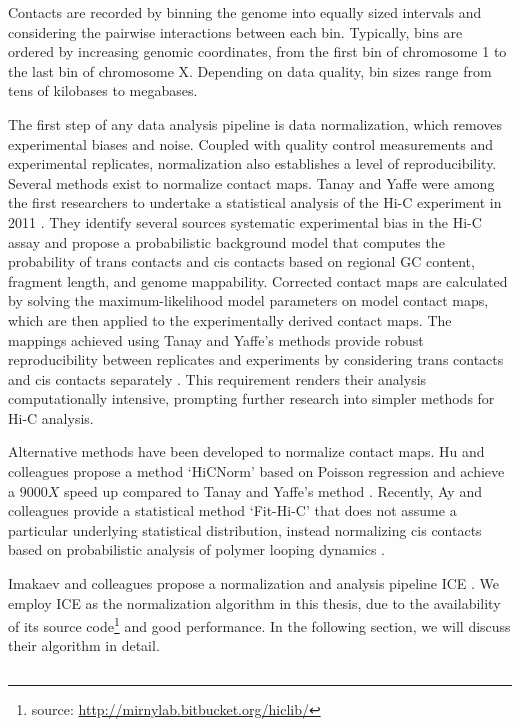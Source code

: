 Contacts are recorded by binning the genome into equally sized intervals and considering the pairwise interactions between each bin.
Typically, bins are ordered by increasing genomic coordinates, from the first bin of chromosome 1 to the last bin of chromosome X.
Depending on data quality, bin sizes range from tens of kilobases to megabases.

The first step of any data analysis pipeline is data \gls{normalization}, which removes experimental biases and noise.  Coupled with quality
control measurements and experimental replicates, normalization also establishes a level of reproducibility.
Several methods exist to normalize contact maps.  Tanay and Yaffe were among the first researchers to undertake a statistical analysis of the
Hi-C experiment in 2011 \citep{yaffe2011}.  They identify several sources systematic experimental bias in the Hi-C assay and propose a
probabilistic background model that computes the probability of \glspl{trans contact} and \glspl{cis contact} based on regional
\gls{GC} content, fragment length, and genome mappability.  Corrected contact maps are calculated by solving the maximum-likelihood model
parameters on model contact maps, which are then applied to the experimentally derived contact maps.  The mappings
achieved using Tanay and Yaffe's methods provide robust reproducibility between replicates and experiments by considering
\glspl{trans contact} and \glspl{cis contact} separately \citep{yaffe2011}.  This requirement renders their analysis computationally
intensive, prompting further research into simpler methods for Hi-C analysis.

Alternative methods have been developed to normalize contact maps.  Hu and colleagues propose a method `HiCNorm' based on Poisson
regression and achieve a $9000X$ speed up compared to Tanay and Yaffe's method \citep{hu2012}.  Recently, Ay and colleagues provide a statistical
method `Fit-Hi-C' that does not assume a particular underlying statistical distribution, instead normalizing \glspl{cis contact} based on probabilistic
analysis of polymer looping dynamics \citep{ay2014}.

Imakaev and colleagues propose a normalization and analysis pipeline \gls{ICE} \citep{imakaev2012}.  We employ \gls{ICE} as the normalization
algorithm in this thesis, due to the availability of its source code\footnote{source: \url{http://mirnylab.bitbucket.org/hiclib/}} and good
performance.  In the following section, we will discuss their algorithm in detail.

\subsection*{}

